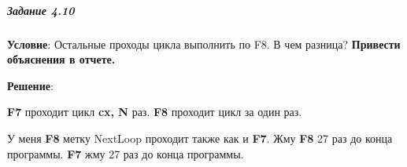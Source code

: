 \subparagraph{Задание 4.10}

\textbf{Условие}:
Остальные проходы цикла выполнить по F8. В чем разница? \textbf{Привести объяснения в отчете.}

\textbf{Решение}:

\textbf{F7} проходит цикл \textbf{cx, N} раз. \textbf{F8} проходит цикл за один раз.

У меня \textbf{F8} метку NextLoop проходит также как и \textbf{F7}. Жму \textbf{F8} 27 раз до конца программы. \textbf{F7} жму 27 раз до конца программы.
